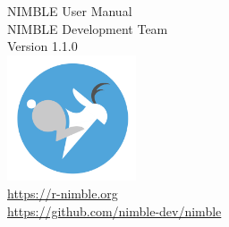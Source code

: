 \thispagestyle{empty}
\begin{center}
{\huge NIMBLE User Manual}\\ 
\vspace{0.2in}
{\large NIMBLE Development Team}\\
\vspace{0.2in}
{\large Version 1.1.0}\\
\vspace{3in}
\includegraphics[width=1.5in]{../nimble-icon.png}\\
{\large
\href{https://r-nimble.org}{https://r-nimble.org}\\
\href{https://github.com/nimble-dev/nimble}{https://github.com/nimble-dev/nimble}
}
\end{center}

